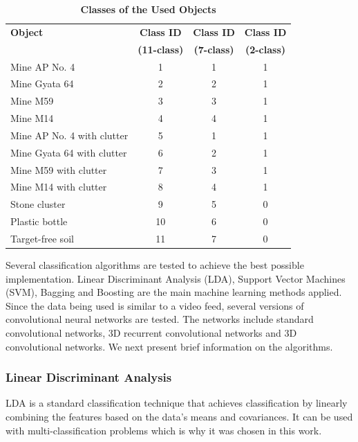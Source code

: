 \documentclass{ieeeaccess}
\begin{document}
\begin{table}
\caption{\textbf{Classes of the Used Objects}}
\label{Table04}
\setlength{\tabcolsep}{3pt}
\begin{center}
\begin{tabular}{|l|c|c|c|}
\hline
\textbf{Object} & \textbf{Class ID} & \textbf{Class ID} & \textbf{Class ID} \\
 & \textbf{(11-class)} & \textbf{(7-class)} & \textbf{(2-class)} \\
 \hline \hline
Mine AP No. 4	& 1	& 1	& 1 \\ \hline
Mine Gyata 64	& 2	& 2	& 1 \\ \hline
Mine M59	& 3	& 3	& 1 \\ \hline
Mine M14	& 4	& 4	& 1 \\ \hline
Mine AP No. 4 with clutter	& 5	& 1	& 1 \\ \hline
Mine Gyata 64 with clutter	& 6	& 2	& 1 \\ \hline
Mine M59 with clutter	& 7	& 3	& 1 \\ \hline
Mine M14 with clutter	& 8	& 4	& 1 \\ \hline
Stone cluster	& 9	& 5	& 0 \\ \hline
Plastic bottle	& 10 & 6 & 0 \\ \hline
Target-free soil	& 11 & 7 & 0 \\
\hline
\end{tabular}
\end{center}
\end{table}


Several classification algorithms are tested to achieve the best possible implementation. Linear Discriminant Analysis (LDA), Support Vector Machines (SVM), Bagging and Boosting are the main machine learning methods applied. Since the data being used is similar to a video feed, several versions of convolutional neural networks are tested. The networks include standard convolutional networks, 3D recurrent convolutional networks and 3D convolutional networks. We next present brief information on the algorithms.

\subsubsection*{Linear Discriminant Analysis}
LDA is a standard classification technique that achieves classification by linearly combining the features based on the data’s means and covariances. It can be used with multi-classification problems which is why it was chosen in this work.
\end{document}
